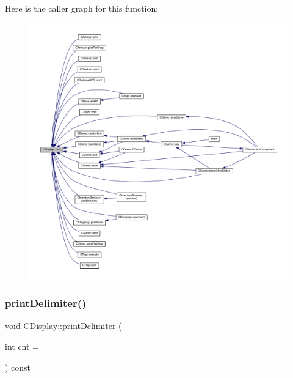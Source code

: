 Here is the caller graph for this function\+:\nopagebreak
\begin{figure}[H]
\begin{center}
\leavevmode
\includegraphics[width=350pt]{class_c_display_a54c5d36f4bc11d4a935ff5c86ea4e653_icgraph}
\end{center}
\end{figure}
\mbox{\label{class_c_display_af350b35b44fc756e0c721ec4ee56c67a}} 
\subsubsection{\texorpdfstring{print\+Delimiter()}{printDelimiter()}}
{\footnotesize\ttfamily void C\+Display\+::print\+Delimiter (\begin{DoxyParamCaption}\item[{int}]{cnt = {} }\end{DoxyParamCaption}) const}

